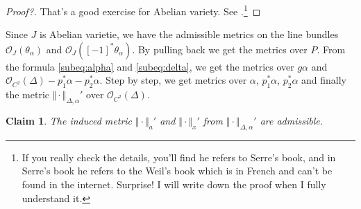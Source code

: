 \documentclass[reqno,11pt]{amsart}
\numberwithin{equation}{section}
\theoremstyle{plain}
\newtheorem{claim}[theorem]{Claim}
\theoremstyle{plain}
\numberwithin{equation}{section}
\theoremstyle{remark}
\newcommand{\norm}[1]{\Vert{#1}\Vert}
\begin{document}
\begin{proof}[Proof?]
That's a good exercise for Abelian variety. See \cite[Lemma A.3]{yuan2021arithmetic}.\footnote{If you really check the details, you'll find he refers to Serre's book, and in Serre's book he refers to the Weil's book which is in French and can't be found in the internet. Surprise! I will write down the proof when I fully understand it.}
\end{proof}

Since $J$ is Abelian varietie, we have the admissible metrics on the line bundles $\mathcal{O}_J(\theta_{\alpha})$ and $\mathcal{O}_J([-1]^* \theta_{\alpha})$. By pulling back we get the metrics over $P$. From the formula \eqref{subeq:alpha} and \eqref{subeq:delta}, we get the metrics over $g\alpha$ and $\mathcal{O}_{C^2}(\Delta)-p_1^*\alpha-p_2^*\alpha$. Step by step, we get metrics over $\alpha$, $p_1^*\alpha$, $p_2^*\alpha$ and finally the metric $\norm{\cdot}_{\Delta,\alpha}'$ over $\mathcal{O}_{C^2}(\Delta)$.
\begin{claim}
The induced metric $\norm{\cdot}_a'$ and $\norm{\cdot}_x'$ from $\norm{\cdot}_{\Delta,\alpha}'$ are admissible.
\end{claim}
\end{document}
